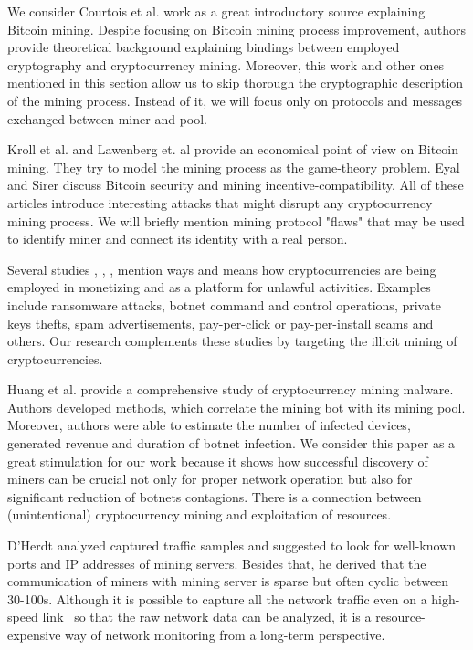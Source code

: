 \documentclass[preprint,12pt,3p]{elsarticle}
\begin{document}
We consider Courtois et al. \cite{courtois2013unreasonable} work as a great introductory source explaining Bitcoin mining. Despite focusing on Bitcoin mining process improvement, authors provide theoretical background explaining bindings between employed cryptography and cryptocurrency mining. Moreover, this work and other ones mentioned in this section allow us to skip thorough the cryptographic description of the mining process. Instead of it, we will focus only on protocols and messages exchanged between miner and pool.

Kroll et al. \cite{kroll2013economics} and Lawenberg et. al \cite{lewenberg2015bitcoin} provide an economical point of view on Bitcoin mining. They try to model the mining process as the game-theory problem. Eyal and Sirer \cite{eyal2014majority} discuss Bitcoin security and mining incentive-compatibility. All of these articles introduce interesting attacks that might disrupt any cryptocurrency mining process. We will briefly mention mining protocol "flaws" that may be used to identify miner and connect its identity with a real person.

Several studies \cite{juels2016ring}, \cite{hampton2015ransomware}, \cite{ali2015zombiecoin}, \cite{kharraz2015cutting} mention ways and means how cryptocurrencies are being employed in monetizing and as a platform for unlawful activities. Examples include ransomware attacks, botnet command and control operations, private keys thefts, spam advertisements, pay-per-click or pay-per-install scams and others. Our research complements these studies by targeting the illicit mining of cryptocurrencies.

Huang et al. \cite{huang2014botcoin} provide a comprehensive study of cryptocurrency mining malware. Authors developed methods, which correlate the mining bot with its mining pool. Moreover, authors were able to estimate the number of infected devices, generated revenue and duration of botnet infection. We consider this paper as a great stimulation for our work because it shows how successful discovery of miners can be crucial not only for proper network operation but also for significant reduction of botnets contagions. There is a connection between (unintentional) cryptocurrency mining and exploitation of resources.

D’Herdt \cite{SANSREPORT} analyzed captured traffic samples and suggested to look for well-known ports and IP addresses of mining servers. Besides that, he derived that the communication of miners with mining server is sparse but often cyclic between 30-100s. Although it is possible to capture all the network traffic even on a high-speed link~\cite{hanic} so that the raw network data can be analyzed, it is a resource-expensive way of network monitoring from a long-term perspective. 
\end{document}
